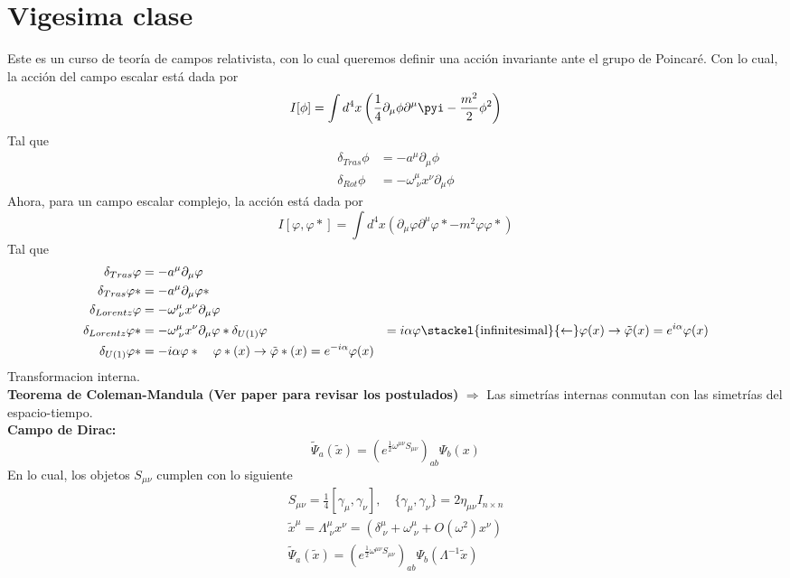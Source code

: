 \documentclass[../main.tex]{subfiles}
\begin{document}
\section{Vigesima clase}
Este es un curso de teoría de campos relativista, con lo cual queremos definir una acción invariante ante el grupo de Poincaré. Con lo cual, la acción del campo escalar está dada por
\begin{equation}
  I[\phi] = \int d^4x \left( \frac{1}{4} \partial_\mu \phi \partial^\mu \pyi - \frac{m^2}{2}\phi^2 \right)
 \end{equation}
 Tal que
 \begin{align}
   \delta_{Tras} \phi & = -a^\mu \partial_\mu \phi \\
   \delta_{Rot}  \phi & = -\omega^\mu_{\; \nu} x^\nu \partial_\mu \phi
 \end{align}
 Ahora, para un campo escalar complejo, la acción está dada por
 \begin{equation}
   I[\varphi , \varphi*] = \int d^4x \left( \partial_\mu \varphi \partial^\mu \varphi* - m^2 \varphi \varphi* \right)
  \end{equation}
  Tal que
  \begin{align}
    \delta_{Tras} \varphi  & = -a^\mu\partial_\mu \varphi \\
    \delta_{Tras} \varphi* & = -a^\mu \partial_\mu \varphi* \\
    \delta_{Lorentz} \varphi & = -\omega^\mu_{\; \nu} x^\nu \partial_\mu \varphi \\
    \delta_{Lorentz} \varphi* & = -\omega^\mu_{\; \nu} x^\nu \partial_\mu \varphi*
    \delta_{U(1)} \varphi & = i\alpha \varphi \stackel{\text{infinitesimal}}{\leftarrow} \varphi(x)\rightarrow \tilde{\varphi}(x) = e^{i\alpha} \varphi(x) \\
    \delta_{U(1)} \varphi* & = -i\alpha \varphi* \quad \varphi* (x) \rightarrow \tilde{\varphi}*(x) = e^{-i\alpha}\varphi(x)
  \end{align}
Transformacion interna. \\
\textbf{Teorema de Coleman-Mandula (Ver paper para revisar los postulados)} $\Rightarrow$ Las simetrías internas conmutan con las simetrías del espacio-tiempo. \\
\textbf{Campo de Dirac:} 
\begin{equation*}
  \tilde{\Psi}_a (\tilde{x}) = \left( e^{\frac{1}{2}\omega^{\mu \nu}S_{\mu \nu}} \right)_{ab} \Psi_b(x)
\end{equation*}
En lo cual, los objetos $S_{\mu \nu}$ cumplen con lo siguiente
\begin{align*}
  S_{\mu \nu} = \frac{1}{4} \left[ \gamma_\mu , \gamma_\nu \right] , \quad \{\gamma_\mu , \gamma_\nu\} = 2\eta_{\mu \nu} I_{n\times n } \\
  \tilde{x}^\mu = \Lambda^\mu_{\; \nu} x^\nu = \left( \delta^\mu_{\; \nu} + \omega^\mu_{\; \nu} + O(\omega^2)x^\nu \right) \\
  \tilde{\Psi}_a(\tilde{x}) = \left( e^{\frac{1}{2}\omega^{\mu \nu} S_{\mu \nu}} \right)_{ab}\Psi_b(\Lambda^{-1}\tilde{x})
\end{align*}
\end{document}
